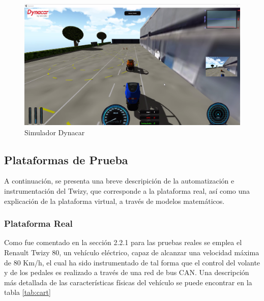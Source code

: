 \begin{figure}[!h]
	\centering
		\includegraphics[scale=0.45]{Imagenes/simu}
		\caption{Simulador Dynacar}
		\label{fig:simu}
\end{figure}	

\subsection{Plataformas de Prueba}

A continuación, se presenta una breve descripición de la automatización e instrumentación del Twizy, que corresponde a la plataforma real, así como una explicación de la plataforma virtual, a través de modelos matemáticos.

\subsubsection{Plataforma Real}

Como fue comentado en la sección 2.2.1 para las pruebas reales se emplea el Renault Twizy 80, un vehículo eléctrico, capaz de alcanzar una velocidad máxima de 80 Km/h, el cual ha sido instrumentado de tal forma que el control del volante y de los pedales es realizado a través de una red de bus CAN. Una descripción más detallada de las características físicas del vehículo se puede encontrar en la tabla \ref{tab:cart} \cite{twizyman}\\

